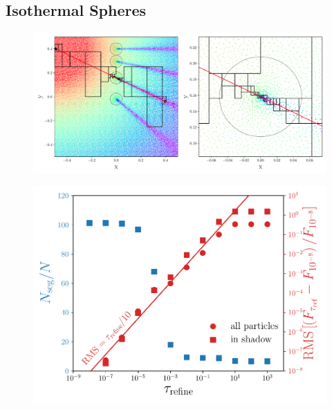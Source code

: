 \documentclass[fleq,usenatbib]{mnras}
\begin{document}
\subsection{Isothermal Spheres}
\begin{figure}
\includegraphics[width=1\linewidth]{Figures/cellplot.pdf}
\caption{}
\label{fig:cellplot}
\end{figure}
\begin{figure}
\includegraphics[width=1\linewidth]{Figures/isothermal_spheres.pdf}
\caption{}
\label{fig:isosph}
\end{figure}
\end{document}
